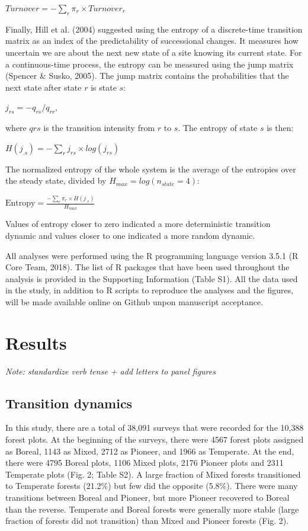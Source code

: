 \documentclass[a4paperpaper,]{article}
\begin{document}
\(Turnover = \displaystyle -\sum_r{\pi_r \times Turnover_{r}}\)

Finally, Hill et al. (2004) suggested using the entropy of a
discrete-time transition matrix as an index of the predictability of
successional changes. It measures how uncertain we are about the next
new state of a site knowing its current state. For a continuous-time
process, the entropy can be measured using the jump matrix (Spencer \&
Susko, 2005). The jump matrix contains the probabilities that the next
state after state \(r\) is state \(s\):

\(j_{rs} = −q_{rs}/q_{rr}\),

where \(qrs\) is the transition intensity from \(r\) to \(s\). The
entropy of state \(s\) is then:

\(H(j_{.s}) = \displaystyle -\sum_r{j_{rs} \times log(j_{rs})}\)

The normalized entropy of the whole system is the average of the
entropies over the steady state, divided by
\(H_{max} = log(n_{state} = 4)\):

\(\text{Entropy} = \displaystyle \frac{-\sum_r{\pi_r \times H(j_{.s})}}{H_{max}}\)

Values of entropy closer to zero indicated a more deterministic
transition dynamic and values closer to one indicated a more random
dynamic.

All analyses were performed using the R programming language version
3.5.1 (R Core Team, 2018). The list of R packages that have been used
throughout the analysis is provided in the Supporting Information (Table
S1). All the data used in the study, in addition to R scripts to
reproduce the analyses and the figures, will be made available online on
Github unpon manuscript acceptance.

\hypertarget{results}{%
\section{Results}\label{results}}

\emph{Note: standardize verb tense + add letters to panel figures}

\hypertarget{transition-dynamics}{%
\subsection{Transition dynamics}\label{transition-dynamics}}

In this study, there are a total of 38,091 surveys that were recorded
for the 10,388 forest plots. At the beginning of the surveys, there were
4567 forest plots assigned as Boreal, 1143 as Mixed, 2712 as Pioneer,
and 1966 as Temperate. At the end, there were 4795 Boreal plots, 1106
Mixed plots, 2176 Pioneer plots and 2311 Temperate plots (Fig. 2; Table
S2). A large fraction of Mixed forests transitioned to Temperate forests
(21.2\%) but few did the opposite (5.8\%). There were many transitions
between Boreal and Pioneer, but more Pioneer recovered to Boreal than
the reverse. Temperate and Boreal forests were generally more stable
(large fraction of forests did not transition) than Mixed and Pioneer
forests (Fig. 2).
\end{document}
